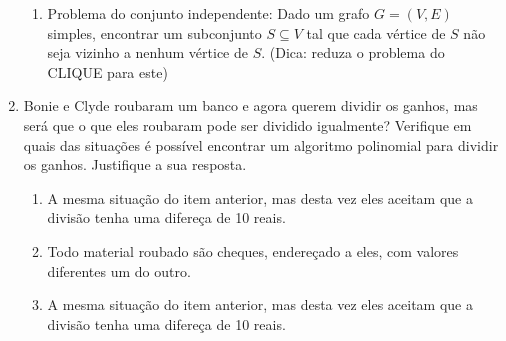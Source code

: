 \documentclass[12pt]{article}
\begin{document}
\begin{enumerate}
\begin{enumerate}
\item Problema do conjunto independente: Dado um grafo $G = (V,E)$ simples, encontrar um subconjunto $S\subseteq V$ tal que cada vértice de $S$ não seja vizinho a nenhum vértice de $S$. (Dica: reduza o problema do CLIQUE para este)

\end{enumerate}

\item Bonie e Clyde roubaram um banco e agora querem dividir os ganhos, mas será que o que eles roubaram pode ser dividido igualmente? 
Verifique em quais das situações é possível encontrar um algoritmo polinomial para dividir os ganhos.
Justifique a sua resposta.

\begin{enumerate}

\item A mesma situação do item anterior, mas desta vez eles aceitam que a divisão tenha uma difereça de 10 reais.

\item Todo material roubado são cheques, endereçado a eles, com valores diferentes um do outro.

\item A mesma situação do item anterior, mas desta vez eles aceitam que a divisão tenha uma difereça de 10 reais.

\end{enumerate}





\end{enumerate}
\end{document}

